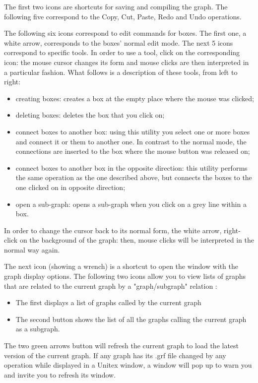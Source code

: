 \medskip
{}
\noindent The first two icons are shortcuts for saving and compiling the graph.
The following five correspond to the Copy, Cut, Paste, Redo and Undo operations. 

\bigskip
\noindent The following six icons correspond to edit commands for boxes. The first
one, a white arrow, corresponds to the boxes' normal edit mode. The next 5 icons
correspond to specific tools. In order to use a tool, click on the
corresponding icon: the mouse cursor changes its form and mouse clicks are then
interpreted in a particular fashion. What follows is a description of these
tools, from left to right:

\begin{itemize}
  \item creating boxes: creates a box at the empty place where the mouse was clicked;
  \item deleting boxes: deletes the box that you click on;
  \item connect boxes to another box: using this utility you select one or
  more boxes and connect it or them to another one. In contrast to the
  normal mode, the connections are inserted to the box where the mouse button
  was released on;
  \item connect boxes to another box in the opposite direction: this utility
  performs the same operation as the one described above, but connects the boxes
  to the one clicked on in opposite direction;
  \item open a sub-graph: opens a sub-graph when you click on a grey line within a box.
\end{itemize}
In order to change the cursor back to its normal form, the white arrow, right-click on the background of the graph:
then, mouse clicks will be interpreted in the normal way again.

\bigskip
\noindent The next icon (showing a wrench) is a shortcut to open the window with the graph display
options.
The following two icons allow you to view lists of graphs that are related to the current graph by a  "graph/subgraph" relation :
\begin{itemize}
\item The first displays a list of graphs called by the current graph
\item The second button shows the list of all the graphs calling the current graph as a subgraph.
\end{itemize}
The two green arrows button will refresh the current graph to load the latest version of the current graph. If any graph has its .grf file changed by any operation while displayed in a Unitex window, a window will pop up to warn you and invite you to refresh its window.

